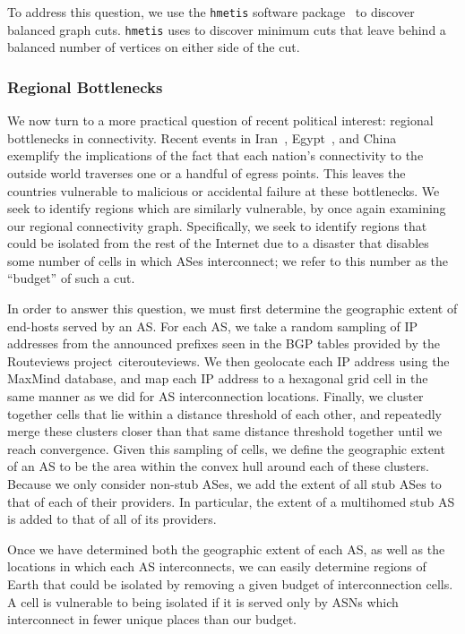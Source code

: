     To address this question, we use the {\tt hmetis} software package~\cite{hmetis} to discover balanced graph cuts.
    {\tt hmetis} uses  to discover minimum cuts that leave behind a balanced number of vertices on either side of the cut.
 
    \subsubsection*{Regional Bottlenecks}
    We now turn to a more practical question of recent political interest: regional bottlenecks in connectivity.
    Recent events in Iran~\cite{iran}, Egypt~\cite{egypt}, and China~\cite{china} exemplify the implications of the fact that each nation's connectivity to the outside world traverses one or a handful of egress points.
    This leaves the countries vulnerable to malicious or accidental failure at these bottlenecks.
    We seek to identify regions which are similarly vulnerable, by once again examining our regional connectivity graph. 
    Specifically, we seek to identify regions that could be isolated from the rest of the Internet due to a disaster that disables some number of cells in which ASes interconnect; we refer to this number as the ``budget'' of such a cut.

    In order to answer this question, we must first determine the geographic extent of end-hosts served by an AS.
    For each AS, we take a random sampling of IP addresses from the announced prefixes seen in the BGP tables provided by the Routeviews project~cite{routeviews}. 
    We then geolocate each IP address using the MaxMind database, and map each IP address to a hexagonal grid cell in the same manner as we did for AS interconnection locations.
    Finally, we cluster together cells that lie within a distance threshold of each other, and repeatedly merge these clusters closer than that same distance threshold together until we reach convergence.
    Given this sampling of cells, we define the geographic extent of an AS to be the area within the convex hull around each of these clusters. 
    Because we only consider non-stub ASes, we add the extent of all stub ASes to that of each of their providers.
    In particular, the extent of a multihomed stub AS is added to that of all of its providers.

    Once we have determined both the geographic extent of each AS, as well as the locations in which each AS interconnects, we can easily determine regions of Earth that could be isolated by removing a given budget of interconnection cells.
    A cell is vulnerable to being isolated if it is served only by ASNs which interconnect in fewer unique places than our budget.

